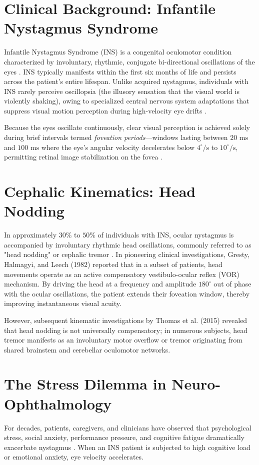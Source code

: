 \documentclass[12pt,a4paper,oneside]{report}
\begin{document}
\section{Clinical Background: Infantile Nystagmus Syndrome}
Infantile Nystagmus Syndrome (INS) is a congenital oculomotor condition characterized by involuntary, rhythmic, conjugate bi-directional oscillations of the eyes \cite{gottlob1997, abadi2002}. INS typically manifests within the first six months of life and persists across the patient's entire lifespan. Unlike acquired nystagmus, individuals with INS rarely perceive oscillopsia (the illusory sensation that the visual world is violently shaking), owing to specialized central nervous system adaptations that suppress visual motion perception during high-velocity eye drifts \cite{bedell2009}. 

Because the eyes oscillate continuously, clear visual perception is achieved solely during brief intervals termed \textit{foveation periods}---windows lasting between $20\text{ ms}$ and $100\text{ ms}$ where the eye's angular velocity decelerates below $4^\circ/\text{s}$ to $10^\circ/\text{s}$, permitting retinal image stabilization on the fovea \cite{dellosso1979}. 

\section{Cephalic Kinematics: Head Nodding}
In approximately $30\%$ to $50\%$ of individuals with INS, ocular nystagmus is accompanied by involuntary rhythmic head oscillations, commonly referred to as "head nodding" or cephalic tremor \cite{gresty1982, thomas2015}. In pioneering clinical investigations, Gresty, Halmagyi, and Leech (1982) \cite{gresty1982} reported that in a subset of patients, head movements operate as an active compensatory vestibulo-ocular reflex (VOR) mechanism. By driving the head at a frequency and amplitude $180^\circ$ out of phase with the ocular oscillations, the patient extends their foveation window, thereby improving instantaneous visual acuity.

However, subsequent kinematic investigations by Thomas et al. (2015) \cite{thomas2015} revealed that head nodding is not universally compensatory; in numerous subjects, head tremor manifests as an involuntary motor overflow or tremor originating from shared brainstem and cerebellar oculomotor networks. 

\section{The Stress Dilemma in Neuro-Ophthalmology}
For decades, patients, caregivers, and clinicians have observed that psychological stress, social anxiety, performance pressure, and cognitive fatigue dramatically exacerbate nystagmus \cite{abadi2002, cham2008}. When an INS patient is subjected to high cognitive load or emotional anxiety, eye velocity accelerates.
\end{document}
